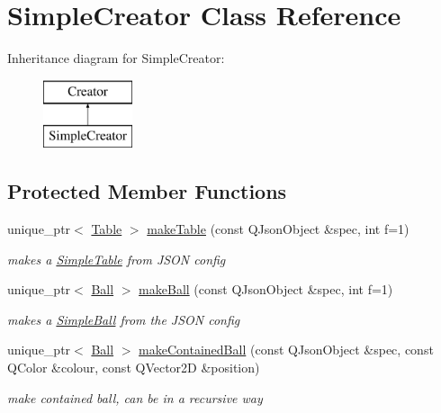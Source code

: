 \hypertarget{class_simple_creator}{}\section{Simple\+Creator Class Reference}
\label{class_simple_creator}
Inheritance diagram for Simple\+Creator\+:\begin{figure}[H]
\begin{center}
\leavevmode
\includegraphics[height=2.000000cm]{class_simple_creator}
\end{center}
\end{figure}
\subsection*{Protected Member Functions}
\begin{DoxyCompactItemize}
\item 
unique\+\_\+ptr$<$ \mbox{\hyperlink{class_table}{Table}} $>$ \mbox{\hyperlink{class_simple_creator_af6556afca4e573deaaf624e8be14dfae}{make\+Table}} (const Q\+Json\+Object \&spec, int f=1)
\begin{DoxyCompactList}\small\item\em makes a \mbox{\hyperlink{class_simple_table}{Simple\+Table}} from J\+S\+ON config \end{DoxyCompactList}\item 
unique\+\_\+ptr$<$ \mbox{\hyperlink{class_ball}{Ball}} $>$ \mbox{\hyperlink{class_simple_creator_a8e5fdfc8bcd5a661cdcfb49d33a51910}{make\+Ball}} (const Q\+Json\+Object \&spec, int f=1)
\begin{DoxyCompactList}\small\item\em makes a \mbox{\hyperlink{class_simple_ball}{Simple\+Ball}} from the J\+S\+ON config \end{DoxyCompactList}\item 
unique\+\_\+ptr$<$ \mbox{\hyperlink{class_ball}{Ball}} $>$ \mbox{\hyperlink{class_simple_creator_a7fdf1b117c73c93da53694639ff6fc6c}{make\+Contained\+Ball}} (const Q\+Json\+Object \&spec, const Q\+Color \&colour, const Q\+Vector2D \&position)
\begin{DoxyCompactList}\small\item\em make contained ball, can be in a recursive way \end{DoxyCompactList}\end{DoxyCompactItemize}
